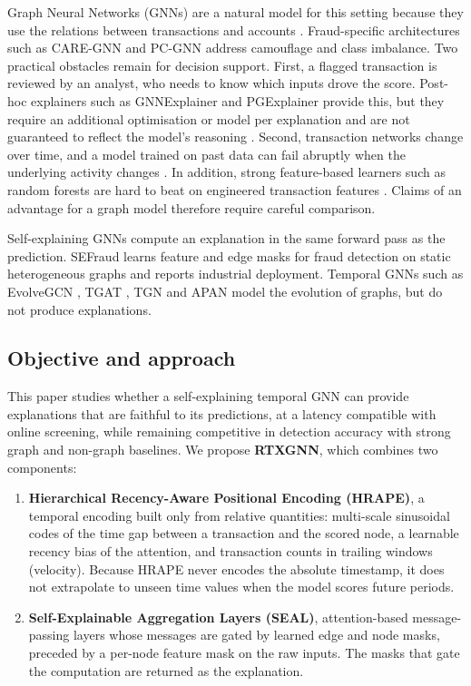Graph Neural Networks (GNNs) are a natural model for this setting because they use the relations between transactions and accounts \citep{kipf2017gcn, velickovic2018gat, hamilton2017graphsage}. Fraud-specific architectures such as CARE-GNN \citep{dou2020caregnn} and PC-GNN \citep{liu2021pcgnn} address camouflage and class imbalance. Two practical obstacles remain for decision support. First, a flagged transaction is reviewed by an analyst, who needs to know which inputs drove the score. Post-hoc explainers such as GNNExplainer \citep{ying2019gnnexplainer} and PGExplainer \citep{luo2020pgexplainer} provide this, but they require an additional optimisation or model per explanation and are not guaranteed to reflect the model's reasoning \citep{faber2021groundtruth}. Second, transaction networks change over time, and a model trained on past data can fail abruptly when the underlying activity changes \citep{weber2019anti, gama2014survey}. In addition, strong feature-based learners such as random forests are hard to beat on engineered transaction features \citep{weber2019anti, grinsztajn2022tree}. Claims of an advantage for a graph model therefore require careful comparison.

Self-explaining GNNs compute an explanation in the same forward pass as the prediction. SEFraud \citep{li2024sefraud} learns feature and edge masks for fraud detection on static heterogeneous graphs and reports industrial deployment. Temporal GNNs such as EvolveGCN \citep{pareja2020evolvegcn}, TGAT \citep{xu2020tgat}, TGN \citep{rossi2020tgn} and APAN \citep{wang2021apan} model the evolution of graphs, but do not produce explanations.

\subsection*{Objective and approach}

This paper studies whether a self-explaining temporal GNN can provide explanations that are faithful to its predictions, at a latency compatible with online screening, while remaining competitive in detection accuracy with strong graph and non-graph baselines. We propose \textbf{RTXGNN}, which combines two components:

\begin{enumerate}
\item \textbf{Hierarchical Recency-Aware Positional Encoding (HRAPE)}, a temporal encoding built only from relative quantities: multi-scale sinusoidal codes of the time gap between a transaction and the scored node, a learnable recency bias of the attention, and transaction counts in trailing windows (velocity). Because HRAPE never encodes the absolute timestamp, it does not extrapolate to unseen time values when the model scores future periods.
\item \textbf{Self-Explainable Aggregation Layers (SEAL)}, attention-based message-passing layers whose messages are gated by learned edge and node masks, preceded by a per-node feature mask on the raw inputs. The masks that gate the computation are returned as the explanation.
\end{enumerate}


